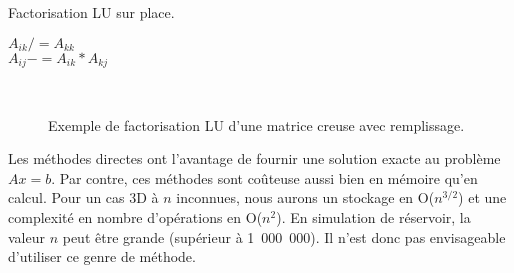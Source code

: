 \begin{algorithm}
  \caption{Factorisation LU sur place.}
  \label{algo:lu}
   {
     {
      $A_{ik} /= A_{kk}$ \\
       {
        $A_{ij} -= A_{ik}*A_{kj}$
      }
    }
  }
\end{algorithm}


\begin{figure}[!h]
     \begin{center}
        ~
    \end{center}
    \caption{Exemple de factorisation LU d'une matrice creuse avec remplissage.}
    \label{fig:lu_example}
\end{figure}


Les méthodes directes ont l'avantage de fournir une solution exacte au problème $Ax=b$.
%
Par contre, ces méthodes sont coûteuse aussi bien en mémoire qu'en calcul.
%
Pour un cas 3D à $n$ inconnues, nous aurons un stockage en O($n^{3/2}$) et une complexité en nombre d'opérations en O($n^2$).
%
En simulation de réservoir, la valeur $n$ peut être grande (supérieur à 1~000~000).
%
Il n'est donc pas envisageable d'utiliser ce genre de méthode.
